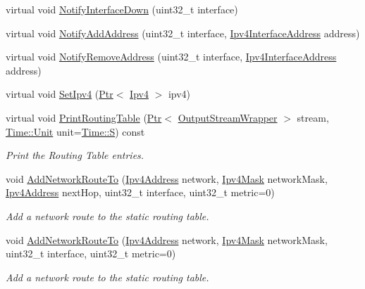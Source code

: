 \begin{DoxyCompactItemize}
\item 
virtual void \hyperlink{classns3_1_1Ipv4StaticRouting_a22f00ba2dabe60e0653e278e221aa97b}{Notify\+Interface\+Down} (uint32\+\_\+t interface)
\item 
virtual void \hyperlink{classns3_1_1Ipv4StaticRouting_ad9cd500198ceab0fec83610cd3f2d1e9}{Notify\+Add\+Address} (uint32\+\_\+t interface, \hyperlink{classns3_1_1Ipv4InterfaceAddress}{Ipv4\+Interface\+Address} address)
\item 
virtual void \hyperlink{classns3_1_1Ipv4StaticRouting_ac7ccf0480e1b0f715a93c474de12b195}{Notify\+Remove\+Address} (uint32\+\_\+t interface, \hyperlink{classns3_1_1Ipv4InterfaceAddress}{Ipv4\+Interface\+Address} address)
\item 
virtual void \hyperlink{classns3_1_1Ipv4StaticRouting_a3caec935381a858c42583d2d023d4499}{Set\+Ipv4} (\hyperlink{classns3_1_1Ptr}{Ptr}$<$ \hyperlink{classns3_1_1Ipv4}{Ipv4} $>$ ipv4)
\item 
virtual void \hyperlink{classns3_1_1Ipv4StaticRouting_a917ee8a51016e159903df505bf7ded25}{Print\+Routing\+Table} (\hyperlink{classns3_1_1Ptr}{Ptr}$<$ \hyperlink{classns3_1_1OutputStreamWrapper}{Output\+Stream\+Wrapper} $>$ stream, \hyperlink{classns3_1_1Time_a87a7f4d29c68b047a72d291ad660295a}{Time\+::\+Unit} unit=\hyperlink{classns3_1_1Time_a87a7f4d29c68b047a72d291ad660295aade8622b06524a328cd3a59db6ccf76af}{Time\+::S}) const 
\begin{DoxyCompactList}\small\item\em Print the Routing Table entries. \end{DoxyCompactList}\item 
void \hyperlink{classns3_1_1Ipv4StaticRouting_a8bf5eaa7ba49fe33c78c70d5560b6c39}{Add\+Network\+Route\+To} (\hyperlink{classns3_1_1Ipv4Address}{Ipv4\+Address} network, \hyperlink{classns3_1_1Ipv4Mask}{Ipv4\+Mask} network\+Mask, \hyperlink{classns3_1_1Ipv4Address}{Ipv4\+Address} next\+Hop, uint32\+\_\+t interface, uint32\+\_\+t metric=0)
\begin{DoxyCompactList}\small\item\em Add a network route to the static routing table. \end{DoxyCompactList}\item 
void \hyperlink{classns3_1_1Ipv4StaticRouting_a04e91acd20c34069034677b1b491f30e}{Add\+Network\+Route\+To} (\hyperlink{classns3_1_1Ipv4Address}{Ipv4\+Address} network, \hyperlink{classns3_1_1Ipv4Mask}{Ipv4\+Mask} network\+Mask, uint32\+\_\+t interface, uint32\+\_\+t metric=0)
\begin{DoxyCompactList}\small\item\em Add a network route to the static routing table. \end{DoxyCompactList}\item 

\end{DoxyCompactItemize}
